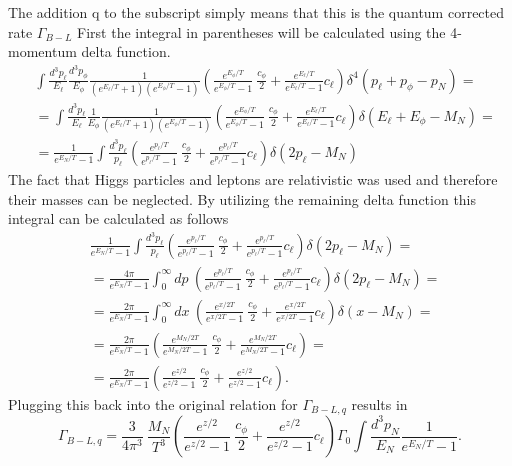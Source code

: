 The addition q to the subscript simply means that this is the quantum corrected rate $\Gamma_{B-L}$
First the integral in parentheses will be calculated using the 4-momentum delta function.
\begin{align*}
	&\int\frac{d^3p_\ell}{E_\ell}\frac{d^3p_\phi}{E_\phi}\frac{1}{\left(e^{E_\ell/T}+1\right)\left(e^{E_\phi/T}-1\right)}\left(\frac{e^{E_\phi/T}}{e^{E_\phi/T}-1}\:\frac{c_\phi}{2}+\frac{e^{E_\ell/T}}{e^{E_\ell/T}-1}c_\ell\right)\delta^4\left(p_\ell+p_\phi-p_N\right)=\\
	&=\int\frac{d^3p_\ell}{E_\ell}\frac{1}{E_\phi}\frac{1}{\left(e^{E_\ell/T}+1\right)\left(e^{E_\phi/T}-1\right)}\left(\frac{e^{E_\phi/T}}{e^{E_\phi/T}-1}\:\frac{c_\phi}{2}+\frac{e^{E_\ell/T}}{e^{E_\ell/T}-1}c_\ell\right)\delta\left(E_\ell+E_\phi-M_N\right)=\\
	&=\frac{1}{e^{E_N/T}-1}\int\frac{d^3p_\ell}{p_\ell}\left(\frac{e^{p_\ell/T}}{e^{p_\ell/T}-1}\:\frac{c_\phi}{2}+\frac{e^{p_\ell/T}}{e^{p_\ell/T}-1}c_\ell\right)\delta\left(2p_\ell-M_N\right)
\end{align*}
The fact that Higgs particles and leptons are relativistic was used and therefore their masses can be neglected. By utilizing the remaining delta function this integral can be calculated as follows 
\begin{align*}
&\frac{1}{e^{E_N/T}-1}\int\frac{d^3p_\ell}{p_\ell}\left(\frac{e^{p_\ell/T}}{e^{p_\ell/T}-1}\:\frac{c_\phi}{2}+\frac{e^{p_\ell/T}}{e^{p_\ell/T}-1}c_\ell\right)\delta\left(2p_\ell-M_N\right)=\\
&=\frac{4\pi}{e^{E_N/T}-1}\int_0^\infty dp\:\left(\frac{e^{p_\ell/T}}{e^{p_\ell/T}-1}\:\frac{c_\phi}{2}+\frac{e^{p_\ell/T}}{e^{p_\ell/T}-1}c_\ell\right)\delta\left(2p_\ell-M_N\right)=\\
&=\frac{2\pi}{e^{E_N/T}-1}\int_0^\infty dx\:\left(\frac{e^{x/2T}}{e^{x/2T}-1}\:\frac{c_\phi}{2}+\frac{e^{x/2T}}{e^{x/2T}-1}c_\ell\right)\delta\left(x-M_N\right)=\\
&=\frac{2\pi}{e^{E_N/T}-1}\left(\frac{e^{M_N/2T}}{e^{M_N/2T}-1}\:\frac{c_\phi}{2}+\frac{e^{M_N/2T}}{e^{M_N/2T}-1}c_\ell\right)=\\
&=\frac{2\pi}{e^{E_N/T}-1}\left(\frac{e^{z/2}}{e^{z/2}-1}\:\frac{c_\phi}{2}+\frac{e^{z/2}}{e^{z/2}-1}c_\ell\right).
\end{align*}
Plugging this back into the original relation for $\Gamma_{B-L,q}$ results in
\begin{equation*}
\Gamma_{B-L,q}=\frac{3}{4\pi^3}\:\frac{M_N}{T^3}\left(\frac{e^{z/2}}{e^{z/2}-1}\:\frac{c_\phi}{2}+\frac{e^{z/2}}{e^{z/2}-1}c_\ell\right)\Gamma_0\int \frac{d^3p_N}{E_N}\frac{1}{e^{E_N/T}-1}.
\end{equation*}
